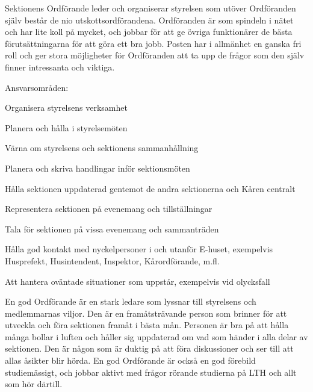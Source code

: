 \documentclass[10pt]{article}
\def\post{Ordförande}
\def\doctitle{Kravprofil för \post}
\begin{document}
\heading{\doctitle}


Sektionens Ordförande leder och organiserar styrelsen som utöver Ordföranden själv består de nio utskottsordförandena.
Ordföranden är som spindeln i nätet och har lite koll på mycket, och jobbar för att ge övriga funktionärer de bästa förutsättningarna för att göra ett bra jobb.
Posten har i allmänhet en ganska fri roll och ger stora möjligheter för Ordföranden att ta upp de frågor som den själv finner intressanta och viktiga.


Ansvarsområden:
\begin{dashlist}
    \item Organisera styrelsens verksamhet
    \item Planera och hålla i styrelsemöten
    \item Värna om styrelsens och sektionens sammanhållning
    \item Planera och skriva handlingar inför sektionsmöten
    \item Hålla sektionen uppdaterad gentemot de andra sektionerna och Kåren centralt
    \item Representera sektionen på evenemang och tillställningar
    \item Tala för sektionen på vissa evenemang och sammanträden
    \item Hålla god kontakt med nyckelpersoner i och utanför E-huset, exempelvis Husprefekt, Husintendent, Inspektor, Kårordförande, m.fl.
    \item Att hantera oväntade situationer som uppstår, exempelvis vid olycksfall
\end{dashlist}


En god Ordförande är en stark ledare som lyssnar till styrelsens och medlemmarnas viljor.
Den är en framåtsträvande person som brinner för att utveckla och föra sektionen framåt i bästa mån.
Personen är bra på att hålla många bollar i luften och håller sig uppdaterad om vad som händer i alla delar av sektionen.
Den är någon som är duktig på att föra diskussioner och ser till att allas åsikter blir hörda.
En god Ordförande är också en god förebild studiemässigt, och jobbar aktivt med frågor rörande studierna på LTH och allt som hör därtill.
\end{document}
